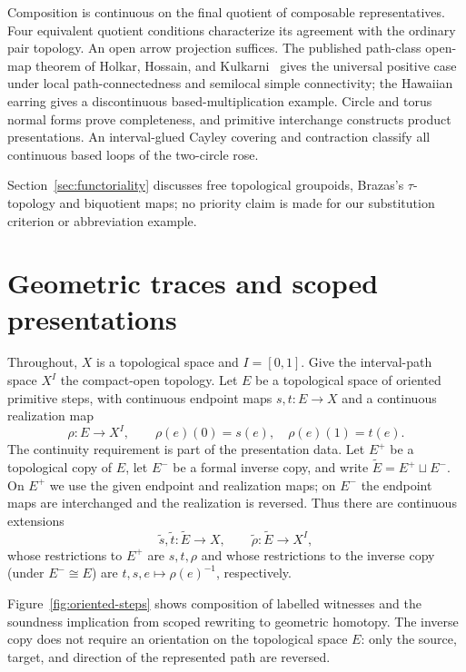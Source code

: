 \documentclass[10pt,reqno]{amsart}
\theoremstyle{definition}
\theoremstyle{plain}
\theoremstyle{remark}
\begin{document}
Composition is continuous on the final quotient of composable
representatives. Four equivalent quotient conditions characterize its
agreement with the ordinary pair topology. An open arrow projection
suffices. The published path-class open-map theorem of Holkar, Hossain,
and Kulkarni~\cite{HolkarHossainKulkarni24} gives the universal positive
case under local path-connectedness and semilocal simple connectivity;
the Hawaiian earring gives a discontinuous based-multiplication example.
Circle and torus normal forms prove completeness, and primitive interchange
constructs product presentations. An interval-glued Cayley covering and contraction classify
all continuous based loops of the two-circle rose.

Section~\ref{sec:functoriality} discusses free topological groupoids,
Brazas's $\tau$-topology and biquotient maps; no priority claim is made for
our substitution criterion or abbreviation example.

\section{Geometric traces and scoped presentations}
\label{sec:traces}

Throughout, $X$ is a topological space and $I=[0,1]$.  Give the interval-path
space $X^I$ the compact-open topology.  Let $E$ be a topological space of
oriented primitive steps, with continuous endpoint maps $s,t:E\to X$ and a
continuous realization map
\[
  \rho:E\longrightarrow X^I,
  \qquad \rho(e)(0)=s(e),\quad \rho(e)(1)=t(e).
\]
The continuity requirement is part of the presentation data.  Let $E^+$ be a
topological copy of $E$, let $E^-$ be a formal inverse copy, and write
\(\widetilde E=E^+\sqcup E^-\).  On $E^+$ we use the given endpoint and
realization maps; on $E^-$ the endpoint maps are interchanged and the
realization is reversed.  Thus there are continuous extensions
\[
  \widetilde s,\widetilde t:\widetilde E\longrightarrow X,
  \qquad
  \widetilde\rho:\widetilde E\longrightarrow X^I,
\]
whose restrictions to $E^+$ are $s,t,\rho$ and whose restrictions to the
inverse copy (under $E^-\cong E$) are $t,s,e\mapsto\rho(e)^{-1}$,
respectively.

Figure~\ref{fig:oriented-steps} shows composition of labelled witnesses and
the soundness implication from scoped rewriting to geometric homotopy.  The inverse copy does not require an
orientation on the topological space $E$: only the source, target, and
direction of the represented path are reversed.
\end{document}
